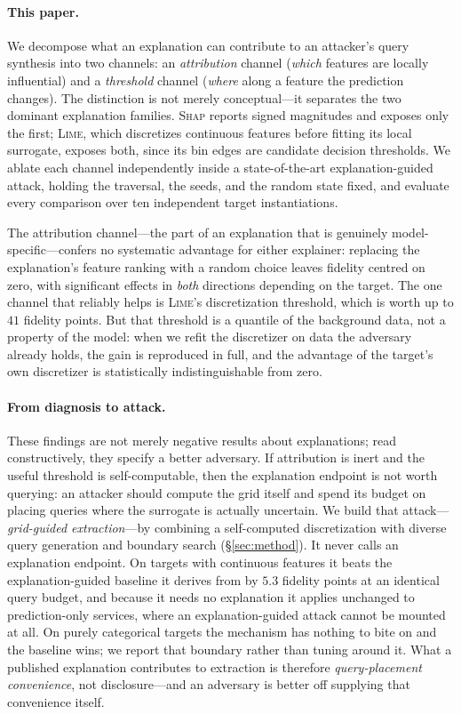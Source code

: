 \documentclass[sigconf,anonymous,review]{acmart}
\begin{document}
\paragraph{This paper.} We decompose what an explanation can contribute to an attacker's query
synthesis into two channels: an \emph{attribution} channel (\emph{which} features are locally
influential) and a \emph{threshold} channel (\emph{where} along a feature the prediction changes).
The distinction is not merely conceptual---it separates the two dominant explanation families.
\textsc{Shap} reports signed magnitudes and exposes only the first; \textsc{Lime}, which discretizes
continuous features before fitting its local surrogate, exposes both, since its bin edges are
candidate decision thresholds. We ablate each channel independently inside a state-of-the-art
explanation-guided attack, holding the traversal, the seeds, and the random state fixed, and evaluate
every comparison over ten independent target instantiations.

The attribution channel---the part of an explanation that is genuinely model-specific---confers no
systematic advantage for either explainer: replacing the explanation's feature ranking with a random
choice leaves fidelity centred on zero, with significant effects in \emph{both} directions depending
on the target. The one channel that reliably helps is \textsc{Lime}'s discretization threshold, which
is worth up to $41$ fidelity points. But that threshold is a quantile of the background data, not a
property of the model: when we refit the discretizer on data the adversary already holds, the gain is
reproduced in full, and the advantage of the target's own discretizer is statistically
indistinguishable from zero.

\paragraph{From diagnosis to attack.} These findings are not merely negative results about
explanations; read constructively, they specify a better adversary. If attribution is inert and the
useful threshold is self-computable, then the explanation endpoint is not worth querying: an attacker
should compute the grid itself and spend its budget on placing queries where the surrogate is actually
uncertain. We build that attack---\emph{grid-guided extraction}---by combining a self-computed
discretization with diverse query generation and boundary search
(\S\ref{sec:method}). It never calls an explanation endpoint. On targets with continuous features it
beats the explanation-guided baseline it derives from by $5.3$ fidelity points at an identical query
budget, and because it needs no explanation it applies unchanged to prediction-only services, where an
explanation-guided attack cannot be mounted at all. On purely categorical targets the mechanism has
nothing to bite on and the baseline wins; we report that boundary rather than tuning around it. What a published explanation contributes to extraction is
therefore \emph{query-placement convenience}, not disclosure---and an adversary is better off supplying
that convenience itself.
\end{document}
